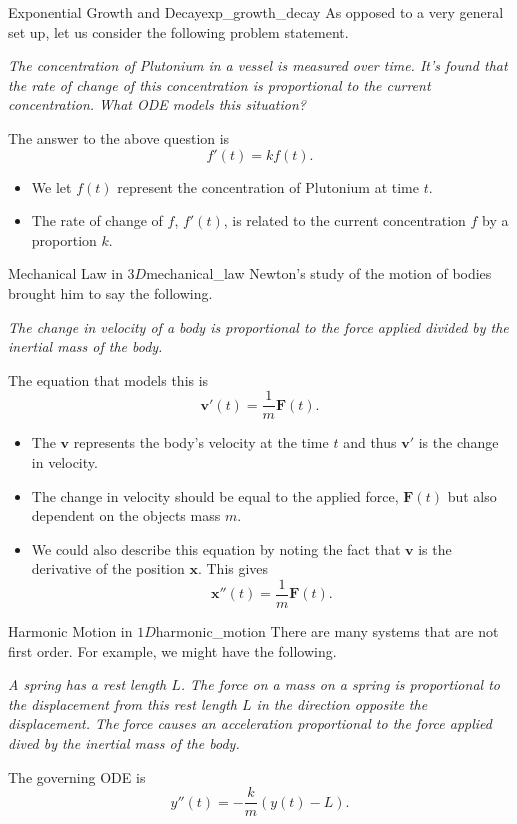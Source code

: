         \begin{ex}{Exponential Growth and Decay}{exp_growth_decay}
        As opposed to a very general set up, let us consider the following problem statement.
        
        \emph{The concentration of Plutonium in a vessel is measured over time.  It's found that the rate of change of this concentration is proportional to the current concentration.  What ODE models this situation?}
        
        The answer to the above question is
        \[
        f'(t)=kf(t).
        \]
        \begin{itemize}
            \item We let $f(t)$ represent the concentration of Plutonium at time $t$.
            \item The rate of change of $f$, $f'(t)$, is related to the current concentration $f$ by a proportion $k$.
        \end{itemize}
        \end{ex}
        
        \begin{ex}{Mechanical Law in $3D$}{mechanical_law}
        Newton's study of the motion of bodies brought him to say the following.
        
        \emph{The change in velocity of a body is proportional to the force applied divided by the inertial mass of the body.}
        
        The equation that models this is
        \[
        \mathbf{v}'(t)=\frac{1}{m} \mathbf{F}(t).
        \]
        \begin{itemize}
            \item The $\mathbf{v}$ represents the body's velocity at the time $t$ and thus $\mathbf{v}'$ is the change in velocity.
            \item The change in velocity should be equal to the applied force, $\mathbf{F}(t)$ but also dependent on the objects mass $m$.
            \item We could also describe this equation by noting the fact that $\mathbf{v}$ is the derivative of the position $\mathbf{x}$. This gives
            \[
            \mathbf{x}''(t)=\frac{1}{m}\mathbf{F}(t).
            \]
        \end{itemize}
        \end{ex}
        
        \begin{ex}{Harmonic Motion in $1D$}{harmonic_motion}
        There are many systems that are not first order.  For example, we might have the following.
        
        \emph{A spring has a rest length $L$. The force on a mass on a spring is proportional to the displacement from this rest length $L$ in the direction opposite the displacement. The force causes an acceleration proportional to the force applied dived by the inertial mass of the body.}
        
        The governing ODE is
        \[
        y''(t) = -\frac{k}{m}(y(t)-L).
        \]
        \end{ex}
        
